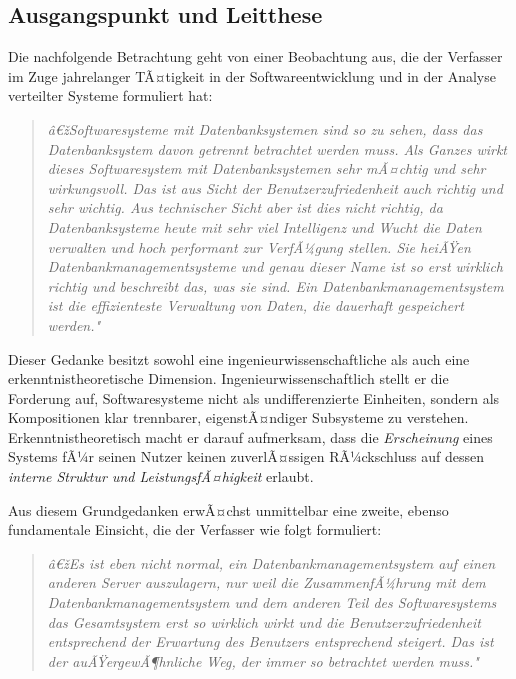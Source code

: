 ﻿\documentclass[a4paper,12pt]{article}
\theoremstyle{definition}
\begin{document}
\subsection{Ausgangspunkt und Leitthese}

Die nachfolgende Betrachtung geht von einer Beobachtung aus, die der Verfasser im Zuge jahrelanger TÃ¤tigkeit in der Softwareentwicklung und in der Analyse verteilter Systeme formuliert hat:

\begin{quote}
\textit{â€žSoftwaresysteme mit Datenbanksystemen sind so zu sehen, dass das Datenbanksystem davon getrennt betrachtet werden muss. Als Ganzes wirkt dieses Softwaresystem mit Datenbanksystemen sehr mÃ¤chtig und sehr wirkungsvoll. Das ist aus Sicht der Benutzerzufriedenheit auch richtig und sehr wichtig. Aus technischer Sicht aber ist dies nicht richtig, da Datenbanksysteme heute mit sehr viel Intelligenz und Wucht die Daten verwalten und hoch performant zur VerfÃ¼gung stellen. Sie heiÃŸen Datenbankmanagementsysteme und genau dieser Name ist so erst wirklich richtig und beschreibt das, was sie sind. Ein Datenbankmanagementsystem ist die effizienteste Verwaltung von Daten, die dauerhaft gespeichert werden."}
\end{quote}

Dieser Gedanke besitzt sowohl eine ingenieurwissenschaftliche als auch eine erkenntnistheoretische Dimension. Ingenieurwissenschaftlich stellt er die Forderung auf, Softwaresysteme nicht als undifferenzierte Einheiten, sondern als Kompositionen klar trennbarer, eigenstÃ¤ndiger Subsysteme zu verstehen. Erkenntnistheoretisch macht er darauf aufmerksam, dass die \emph{Erscheinung} eines Systems fÃ¼r seinen Nutzer keinen zuverlÃ¤ssigen RÃ¼ckschluss auf dessen \emph{interne Struktur und LeistungsfÃ¤higkeit} erlaubt.

Aus diesem Grundgedanken erwÃ¤chst unmittelbar eine zweite, ebenso fundamentale Einsicht, die der Verfasser wie folgt formuliert:

\begin{quote}
\textit{â€žEs ist eben nicht normal, ein Datenbankmanagementsystem auf einen anderen Server auszulagern, nur weil die ZusammenfÃ¼hrung mit dem Datenbankmanagementsystem und dem anderen Teil des Softwaresystems das Gesamtsystem erst so wirklich wirkt und die Benutzerzufriedenheit entsprechend der Erwartung des Benutzers entsprechend steigert. Das ist der auÃŸergewÃ¶hnliche Weg, der immer so betrachtet werden muss."}
\end{quote}
\end{document}
